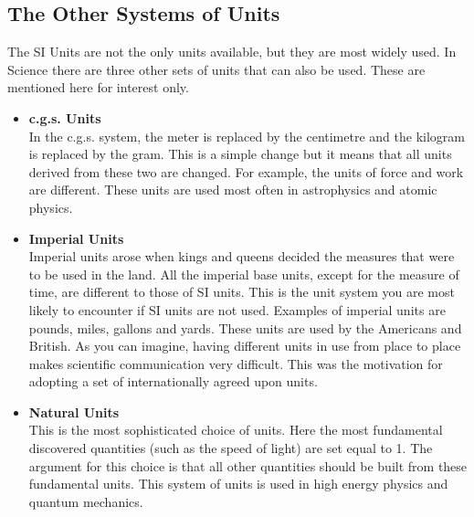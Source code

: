  \subsection*{The Other Systems of Units}
            \nopagebreak
The SI Units are not the only units available, but they are most widely used. In Science there are three other sets of units that can also be used. These are mentioned here for interest only.
\begin{itemize}
 \item \textbf{c.g.s. Units} \\
In the c.g.s. system, the meter is replaced by the centimetre and the kilogram is replaced by the gram. This is a simple change but it means that all units derived from these two are changed. For example, the units of force and work are different. These units are used most often in astrophysics and atomic physics.
\item \textbf{Imperial Units} \\
Imperial units arose when kings and queens decided the measures that were to be used in the land. All the imperial base units, except for the measure of time, are different to those of SI units. This is the unit system you are most likely to encounter if SI units are not used. Examples of imperial units are pounds, miles, gallons and yards. These units are used by the Americans and British. As you can imagine, having different units in use from place to place makes scientific communication very difficult. This was the motivation for adopting a set of internationally agreed upon units.
\item \textbf{Natural Units} \\
This is the most sophisticated choice of units. Here the most fundamental discovered quantities (such as the speed of light) are set equal to 1. The argument for this choice is that all other quantities should be built from these fundamental units. This system of units is used in high energy physics and quantum mechanics.
\end{itemize}
